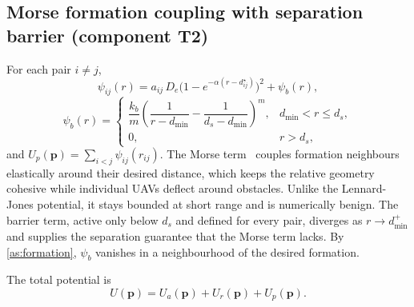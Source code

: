 \documentclass[11pt]{article}
\theoremstyle{definition}
\theoremstyle{remark}
\newcommand{\bp}{\mathbf{p}}
\newcommand{\dmin}{d_{\min}}
\begin{document}
\subsection{Morse formation coupling with separation barrier (component T2)}
For each pair $i\neq j$,
\begin{equation}\label{eq:psi}
  \psi_{ij}(r)=a_{ij}\,D_e\bigl(1-e^{-\alpha(r-d_{ij}^\star)}\bigr)^2+\psi_b(r),
\end{equation}
\begin{equation}\label{eq:barrier}
  \psi_b(r)=\begin{cases}\dfrac{k_b}{m}\left(\dfrac{1}{r-\dmin}-\dfrac{1}{d_s-\dmin}\right)^{m}, & \dmin<r\le d_s,\\[1ex] 0, & r>d_s,\end{cases}
\end{equation}
and $U_p(\bp)=\sum_{i<j}\psi_{ij}(r_{ij})$. The Morse term~\cite{morse1929,xu2025consensus}
couples formation neighbours elastically around their desired distance, which
keeps the relative geometry cohesive while individual UAVs deflect around
obstacles. Unlike the Lennard-Jones potential, it stays bounded at short range
and is numerically benign. The barrier term, active only below $d_s$ and
defined for every pair, diverges as $r\to\dmin^+$ and supplies the separation
guarantee that the Morse term lacks. By \cref{as:formation}, $\psi_b$ vanishes
in a neighbourhood of the desired formation.

The total potential is
\begin{equation}\label{eq:U}
  U(\bp)=U_a(\bp)+U_r(\bp)+U_p(\bp).
\end{equation}
\end{document}
